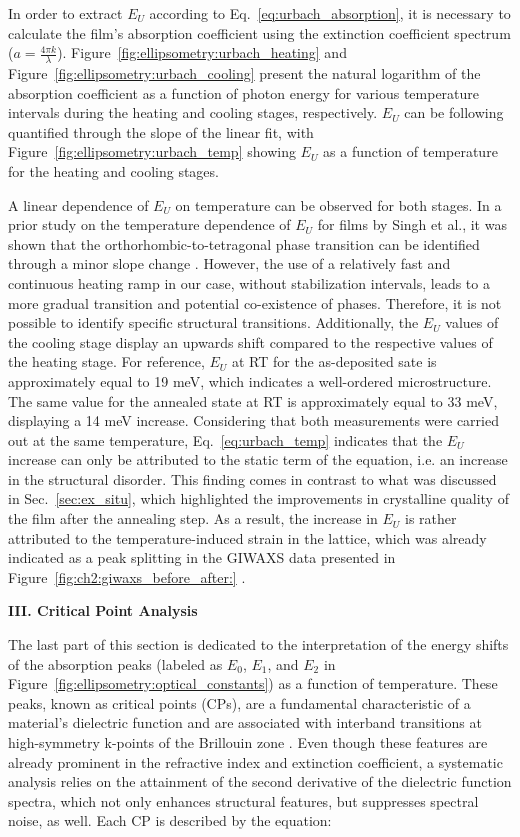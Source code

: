 In order to extract $E_U$ according to Eq.~\ref{eq:urbach_absorption}, it is necessary to calculate the film's absorption coefficient using the extinction coefficient spectrum ($a = \frac{4\pi k}{\lambda}$). Figure~\ref{fig:ellipsometry:urbach_heating} and Figure~\ref{fig:ellipsometry:urbach_cooling} present the natural logarithm of the absorption coefficient as a function of photon energy for various temperature intervals during the heating and cooling stages, respectively. $E_U$ can be following quantified through the slope of the linear fit, with Figure~\ref{fig:ellipsometry:urbach_temp} showing $E_U$ as a function of temperature for the heating and cooling stages. 

A linear dependence of $E_U$ on temperature can be observed for both stages. In a prior study on the temperature dependence of $E_U$ for  films by Singh et al., it was shown that the orthorhombic-to-tetragonal phase transition can be identified through a minor slope change \cite{Singh2016EffectCH3NH3PbI3}. However, the use of a relatively fast and continuous heating ramp in our case, without stabilization intervals, leads to a more gradual transition and potential co-existence of phases. Therefore, it is not possible to identify specific structural transitions. Additionally, the $E_U$ values of the cooling stage display an upwards shift compared to the respective values of the heating stage. For reference, $E_U$ at RT for the as-deposited sate is approximately equal to 19 meV, which indicates a well-ordered microstructure. The same value for the annealed state at RT is approximately equal to 33 meV, displaying a 14 meV increase. Considering that both measurements were carried out at the same temperature, Eq.~\ref{eq:urbach_temp} indicates that the $E_U$ increase can only be attributed to the static term of the equation, i.e. an increase in the structural disorder. This finding comes in contrast to what was discussed in Sec.~\ref{sec:ex_situ}, which highlighted the improvements in crystalline quality of the film after the annealing step. As a result, the increase in $E_U$ is rather attributed to the temperature-induced strain in the lattice, which was already indicated as a peak splitting in the GIWAXS data presented in Figure~\ref{fig:ch2:giwaxs_before_after:} \cite{Kim2020ImpactCells}. 



\textbf{III. Critical Point Analysis}


The last part of this section is dedicated to the interpretation of the energy shifts of the absorption peaks (labeled as $E_0$, $E_1$, and $E_2$ in Figure~\ref{fig:ellipsometry:optical_constants}) as a function of temperature. These peaks, known as critical points (CPs), are a fundamental characteristic of a material's dielectric function and are associated with interband transitions at high-symmetry k-points of the Brillouin zone \cite{Aspnes1983DielectricEV}. Even though these features are already prominent in the refractive index and extinction coefficient, a systematic analysis relies on the attainment of the second derivative of the dielectric function spectra, which not only enhances structural features, but suppresses spectral noise, as well. Each CP is described by the equation: 

